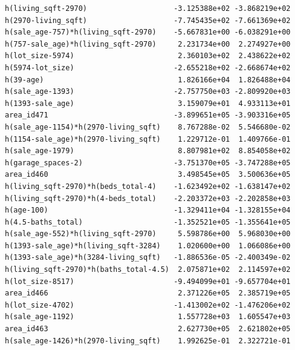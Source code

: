 \documentclass[
]{article}
\begin{document}
\begin{verbatim}
h(living_sqft-2970)                    -3.125388e+02 -3.868219e+02
h(2970-living_sqft)                    -7.745435e+02 -7.661369e+02
h(sale_age-757)*h(living_sqft-2970)    -5.667831e+00 -6.038291e+00
h(757-sale_age)*h(living_sqft-2970)     2.231734e+00  2.274927e+00
h(lot_size-5974)                        2.360103e+02  2.438622e+02
h(5974-lot_size)                       -2.655218e+02 -2.668674e+02
h(39-age)                               1.826166e+04  1.826488e+04
h(sale_age-1393)                       -2.757750e+03 -2.809920e+03
h(1393-sale_age)                        3.159079e+01  4.933113e+01
area_id471                             -3.899651e+05 -3.903316e+05
h(sale_age-1154)*h(2970-living_sqft)    8.767288e-02  5.546680e-02
h(1154-sale_age)*h(2970-living_sqft)    1.229712e-01  1.409766e-01
h(sale_age-1979)                        8.807981e+02  8.854058e+02
h(garage_spaces-2)                     -3.751370e+05 -3.747288e+05
area_id460                              3.498545e+05  3.500636e+05
h(living_sqft-2970)*h(beds_total-4)    -1.623492e+02 -1.638147e+02
h(living_sqft-2970)*h(4-beds_total)    -2.203372e+03 -2.202858e+03
h(age-100)                             -1.329411e+04 -1.328155e+04
h(4.5-baths_total)                     -1.352521e+05 -1.355641e+05
h(sale_age-552)*h(living_sqft-2970)     5.598786e+00  5.968030e+00
h(1393-sale_age)*h(living_sqft-3284)    1.020600e+00  1.066086e+00
h(1393-sale_age)*h(3284-living_sqft)   -1.886536e-05 -2.400349e-02
h(living_sqft-2970)*h(baths_total-4.5)  2.075871e+02  2.114597e+02
h(lot_size-8517)                       -9.494099e+01 -9.657704e+01
area_id466                              2.371226e+05  2.385719e+05
h(lot_size-4702)                       -1.413002e+02 -1.476206e+02
h(sale_age-1192)                        1.557728e+03  1.605547e+03
area_id463                              2.627730e+05  2.621802e+05
h(sale_age-1426)*h(2970-living_sqft)    1.992625e-01  2.322721e-01
                                                                  

\end{verbatim}
\end{document}

